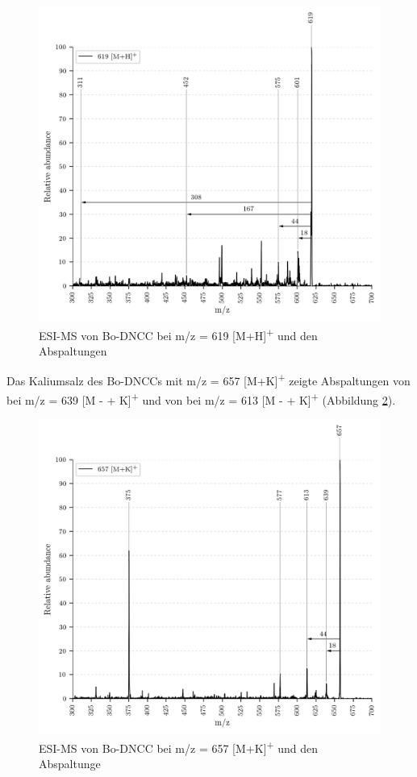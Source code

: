 \begin{figure}[!htbp]
  \includegraphics[width=\textwidth, height=0.7\textwidth]{figures/Kapitel4/Kataboliten/VWA_MS_LeafSpray_619.png}
  \caption[ESI-MS von Bo-DNCC, Quelle: Autor]{ESI-MS von Bo-DNCC bei m/z = 619 [M+H]\textsuperscript{+} und den Abspaltungen}
  \label{fig:619MHLeafspray}
\end{figure}

Das Kaliumsalz des Bo-DNCCs mit m/z = 657 [M+K]\textsuperscript{+} zeigte Abspaltungen von  bei m/z = 639 [M -  + K]\textsuperscript{+} und von  bei m/z = 613 [M -  + K]\textsuperscript{+} (Abbildung \ref{fig:657MKLeafspray}).

\begin{figure}[!htbp]
  \includegraphics[width=\textwidth, height=0.7\textwidth]{figures/Kapitel4/Kataboliten/VWA_MS_LeafSpray_657.png}
  \caption[ESI-MS von Bo-DNCC, Quelle: Autor]{ESI-MS von Bo-DNCC bei m/z = 657 [M+K]\textsuperscript{+} und den Abspaltunge}
  \label{fig:657MKLeafspray}
\end{figure}

